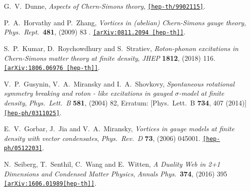 \documentclass[12pt,a4paper]{article}
\begin{document}
\begin{thebibliography}{99}
 
  G.~V.~Dunne,
 {\it Aspects of Chern-Simons theory},
  \href{https://arxiv.org/abs/hep-th/9902115}{\tt[hep-th/9902115]}.

  P.~A.~Horvathy and P.~Zhang,
  {\it Vortices in (abelian) Chern-Simons gauge theory},
  {\it Phys.\ Rept.}\  {\bf 481}, (2009) 83 .
  \href{https://arxiv.org/abs/0811.2094}{\tt [arXiv:0811.2094 [hep-th]]}.

  S.~P.~Kumar, D.~Roychowdhury and S.~Stratiev,
 {\it Roton-phonon excitations in Chern-Simons matter theory at finite density},
  {\it JHEP} {\bf 1812}, (2018) 116.
  \href{https://arxiv.org/abs/1806.06976}{\tt[arXiv:1806.06976 [hep-th]]}.

  V.~P.~Gusynin, V.~A.~Miransky and I.~A.~Shovkovy,
 {\it Spontaneous rotational symmetry breaking and roton - like excitations in gauged $\sigma$-model at finite density}, 
  {\it Phys.\ Lett.\ B} {\bf 581},  (2004) 82,
  Erratum: [Phys.\ Lett.\ B {\bf 734}, 407 (2014)]
 \href{https://arxiv.org/abs/1404.1284}{\tt[hep-ph/0311025]}.
  


  E.~V.~Gorbar, J.~Jia and V.~A.~Miransky,
  {\it Vortices in gauge models at finite density with vector condensates},
  {\it Phys.\ Rev.\ D} {\bf 73}, (2006) 045001.
  \href{https://arxiv.org/abs/hep-ph/0512203}{\tt [hep-ph/0512203]}.
  
  N.~Seiberg, T.~Senthil, C.~Wang and E.~Witten,
  {\it A Duality Web in 2+1 Dimensions and Condensed Matter Physics},
  {\it Annals Phys.}\  {\bf 374}, (2016) 395 
  \href{https://arxiv.org/abs/1606.01989}{\tt[arXiv:1606.01989[hep-th]]}.
  

\end{thebibliography}
\end{document}
